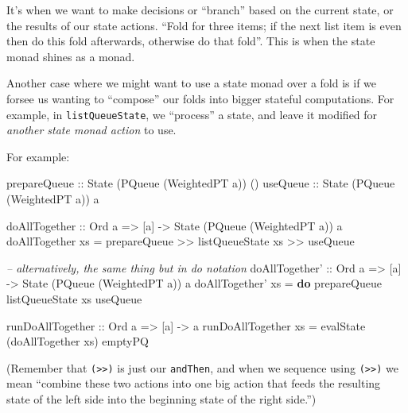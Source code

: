 \documentclass[]{article}
\newenvironment{Shaded}{}{}
\newcommand{\KeywordTok}[1]{\textcolor[rgb]{0.00,0.44,0.13}{\textbf{{#1}}}}
\newcommand{\DataTypeTok}[1]{\textcolor[rgb]{0.56,0.13,0.00}{{#1}}}
\newcommand{\CommentTok}[1]{\textcolor[rgb]{0.38,0.63,0.69}{\textit{{#1}}}}
\newcommand{\OtherTok}[1]{\textcolor[rgb]{0.00,0.44,0.13}{{#1}}}
\newcommand{\FunctionTok}[1]{\textcolor[rgb]{0.02,0.16,0.49}{{#1}}}
\newcommand{\NormalTok}[1]{{#1}}
\begin{document}
It's when we want to make decisions or ``branch'' based on the current state, or
the results of our state actions. ``Fold for three items; if the next list item
is even then do this fold afterwards, otherwise do that fold''. This is when the
state monad shines as a monad.

Another case where we might want to use a state monad over a fold is if we
forsee us wanting to ``compose'' our folds into bigger stateful computations.
For example, in \texttt{listQueueState}, we ``process'' a state, and leave it
modified for \emph{another state monad action} to use.

For example:

\begin{Shaded}
\begin{Highlighting}[]
\OtherTok{prepareQueue ::} \DataTypeTok{State} \NormalTok{(}\DataTypeTok{PQueue} \NormalTok{(}\DataTypeTok{WeightedPT} \NormalTok{a)) ()}
\OtherTok{useQueue     ::} \DataTypeTok{State} \NormalTok{(}\DataTypeTok{PQueue} \NormalTok{(}\DataTypeTok{WeightedPT} \NormalTok{a)) a}

\OtherTok{doAllTogether ::} \DataTypeTok{Ord} \NormalTok{a }\OtherTok{=>} \NormalTok{[a] }\OtherTok{->} \DataTypeTok{State} \NormalTok{(}\DataTypeTok{PQueue} \NormalTok{(}\DataTypeTok{WeightedPT} \NormalTok{a)) a}
\NormalTok{doAllTogether xs }\FunctionTok{=} \NormalTok{prepareQueue }\FunctionTok{>>} \NormalTok{listQueueState xs }\FunctionTok{>>} \NormalTok{useQueue}

\CommentTok{-- alternatively, the same thing but in do notation}
\OtherTok{doAllTogether' ::} \DataTypeTok{Ord} \NormalTok{a }\OtherTok{=>} \NormalTok{[a] }\OtherTok{->} \DataTypeTok{State} \NormalTok{(}\DataTypeTok{PQueue} \NormalTok{(}\DataTypeTok{WeightedPT} \NormalTok{a)) a}
\NormalTok{doAllTogether' xs }\FunctionTok{=} \KeywordTok{do}
    \NormalTok{prepareQueue}
    \NormalTok{listQueueState xs}
    \NormalTok{useQueue}

\OtherTok{runDoAllTogether ::} \DataTypeTok{Ord} \NormalTok{a }\OtherTok{=>} \NormalTok{[a] }\OtherTok{->} \NormalTok{a}
\NormalTok{runDoAllTogether xs }\FunctionTok{=} \NormalTok{evalState (doAllTogether xs) emptyPQ}
\end{Highlighting}
\end{Shaded}

(Remember that \texttt{(\textgreater{}\textgreater{})} is just our
\texttt{andThen}, and when we sequence using
\texttt{(\textgreater{}\textgreater{})} we mean ``combine these two actions into
one big action that feeds the resulting state of the left side into the
beginning state of the right side.'')
\end{document}
